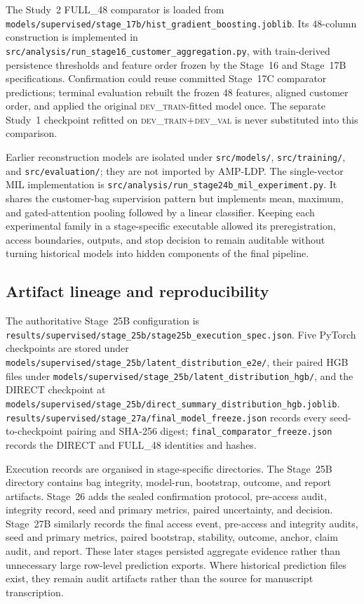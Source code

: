 The Study~2 FULL\_48 comparator is loaded from \texttt{models/supervised/stage\_17b/hist\_gradient\_boosting.joblib}. Its 48-column construction is implemented in \texttt{src/analysis/run\_stage16\_customer\_aggregation.py}, with train-derived persistence thresholds and feature order frozen by the Stage~16 and Stage~17B specifications. Confirmation could reuse committed Stage~17C comparator predictions; terminal evaluation rebuilt the frozen 48 features, aligned customer order, and applied the original \textsc{dev\_train}-fitted model once. The separate Study~1 checkpoint refitted on \textsc{dev\_train}+\textsc{dev\_val} is never substituted into this comparison.

Earlier reconstruction models are isolated under \texttt{src/models/}, \texttt{src/training/}, and \texttt{src/evaluation/}; they are not imported by AMP-LDP. The single-vector MIL implementation is \texttt{src/analysis/run\_stage24b\_mil\_experiment.py}. It shares the customer-bag supervision pattern but implements mean, maximum, and gated-attention pooling followed by a linear classifier. Keeping each experimental family in a stage-specific executable allowed its preregistration, access boundaries, outputs, and stop decision to remain auditable without turning historical models into hidden components of the final pipeline.

\subsection{Artifact lineage and reproducibility}

The authoritative Stage~25B configuration is \texttt{results/supervised/stage\_25b/stage25b\_execution\_spec.json}. Five PyTorch checkpoints are stored under \texttt{models/supervised/stage\_25b/latent\_distribution\_e2e/}, their paired HGB files under \texttt{models/supervised/stage\_25b/latent\_distribution\_hgb/}, and the DIRECT checkpoint at \texttt{models/supervised/stage\_25b/direct\_summary\_distribution\_hgb.joblib}. \texttt{results/supervised/stage\_27a/final\_model\_freeze.json} records every seed-to-checkpoint pairing and SHA-256 digest; \texttt{final\_comparator\_freeze.json} records the DIRECT and FULL\_48 identities and hashes.

Execution records are organised in stage-specific directories. The Stage~25B directory contains bag integrity, model-run, bootstrap, outcome, and report artifacts. Stage~26 adds the sealed confirmation protocol, pre-access audit, integrity record, seed and primary metrics, paired uncertainty, and decision. Stage~27B similarly records the final access event, pre-access and integrity audits, seed and primary metrics, paired bootstrap, stability, outcome, anchor, claim audit, and report. These later stages persisted aggregate evidence rather than unnecessary large row-level prediction exports. Where historical prediction files exist, they remain audit artifacts rather than the source for manuscript transcription.

